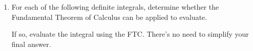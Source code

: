 \documentclass[11pt]{article}
\begin{document}
\begin{enumerate}
Although no work is required, you are encouraged to include any work that shows your thought process. 


\begin{center}
        \begin{tabular}{l c r l c r}
            $\displaystyle\int 3\,dx$ & $=$ \   \underline{{\color{blue} $3x + C$}} &
            \vspace{0.5cm}

            $\displaystyle\int \dfrac{1}{x^7} \,dx$ & $=$ \ \underline{{\color{blue} $-\frac{1}{6x^{6}} + C$}} &\\
            \vspace{0.5cm}

            $\displaystyle\int 3^x\,dx$ & $=$ \ \underline{{\color{blue} $\frac{3^x}{\ln(3)} + C$}} &
            \vspace{0.5cm}
            
            $\displaystyle\int x^3 + 2x\,dx$ & $=$  \underline{\color{blue}{ $\frac{x^4}{4} + x^2 + C$}} & \\
            $\displaystyle\int 3x^4 \,dx$ & $=$ \underline{\color{blue}{ $\frac{3}{5}x^5 + C$}} & 
            $\displaystyle\int \dfrac{1}{x} \,dx$ & $=$  \underline{\color{blue}{ $\ln|x| + C$}} &
        \end{tabular}
\end{center}


\newpage


\item For each of the following definite integrals, determine whether the Fundamental Theorem of Calculus can be applied to evaluate. 

If so, evaluate the integral using the FTC. There's no need to simplify your final answer.


\end{enumerate}
\end{document}
